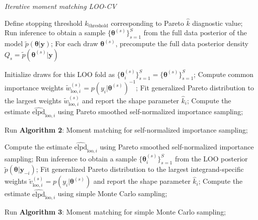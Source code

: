 \documentclass[12pt]{article}
\newcommand{\ome}{v}
\begin{document}
\begin{algorithm*}[htb]
	\caption{\em Iterative moment matching LOO-CV}\label{alg:mm}
	\begin{algorithmic}[1]
	    \STATE Define stopping threshold $k_{\text{threshold}}$ corresponding to Pareto $\hat{k}$
	    diagnostic value;
		\STATE Run inference to obtain a sample $\{ \boldsymbol{\theta}^{(s)} \}_{s = 1}^S$ from the full data posterior of the model $\widetilde{p} (\boldsymbol{\theta} | \mathbf{y})$;
		\STATE For each draw $\boldsymbol{\theta}^{(s)}$, precompute the full data posterior density $Q_s = \widetilde{p} (\boldsymbol{\theta}^{(s)}|\mathbf{y})$
		 
		\STATE Initialize draws for this LOO fold as $\{ \boldsymbol{\theta}_i^{(s)} \}_{s = 1}^S = \{ \boldsymbol{\theta}^{(s)} \}_{s = 1}^S$;
		\STATE Compute common importance weights $\widetilde{w}_{\text{loo},i}^{(s)} = p (y_i | \boldsymbol{\theta}^{(s)})^{-1}$;
		\STATE Fit generalized Pareto distribution to the largest weights $\widetilde{w}_{\text{loo},i}^{(s)}$ and report the shape parameter $\hat{k}_i$;
		\STATE Compute the estimate $\widehat{\text{elpd}}_{\text{loo},i}$ using Pareto smoothed self-normalized importance sampling;
		\ELSE
		
		\STATE Run \textbf{Algorithm 2}: Moment matching for self-normalized importance sampling;

		\STATE Compute the estimate $\widehat{\text{elpd}}_{\text{loo},i}$ using Pareto smoothed self-normalized importance sampling;
		\ELSE
		\STATE Run inference to obtain a sample $\{ \boldsymbol{\theta}_i^{(s)} \}_{s = 1}^S$ from the LOO posterior $\widetilde{p} (\boldsymbol{\theta} | \mathbf{y}_{-i})$;
		\STATE Fit generalized Pareto distribution to the largest integrand-specific weights
		$\widetilde{\ome}_{\text{loo},i}^{(s)} = p(y_i | \boldsymbol{\theta}^{(s)})$ and report the shape parameter $\hat{k}_i$;
		\STATE Compute the estimate $\widehat{\text{elpd}}_{\text{loo},i}$ using simple Monte Carlo sampling;
		\ELSE
		
		
		
		\STATE Run \textbf{Algorithm 3}: Moment matching for simple Monte Carlo sampling;
		

		
		
		
		\ENDIF
		\ENDIF
		\ENDIF
		\ENDFOR
		 
	\end{algorithmic}
\end{algorithm*}
\end{document}
